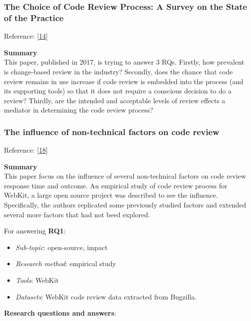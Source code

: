 \documentclass[]{book}
\providecommand{\tightlist}{%
  \setlength{\itemsep}{0pt}\setlength{\parskip}{0pt}}
\begin{document}
\subsubsection{The Choice of Code Review Process: A Survey on the State
of the
Practice}\label{the-choice-of-code-review-process-a-survey-on-the-state-of-the-practice}

Reference: {[}\protect\hyperlink{ref-baum2017choice}{14}{]}

\textbf{Summary}\\
This paper, published in 2017, is trying to answer 3 RQs. Firstly, how
prevalent is change-based review in the industry? Secondly, does the
chance that code review remains in use increase if code review is
embedded into the process (and its supporting tools) so that it does not
require a conscious decision to do a review? Thirdly, are the intended
and acceptable levels of review effects a mediator in determining the
code review process?

\subsubsection{The influence of non-technical factors on code
review}\label{the-influence-of-non-technical-factors-on-code-review}

Reference: {[}\protect\hyperlink{ref-baysal2013influence}{18}{]}

\textbf{Summary}\\
This paper focus on the influence of several non-technical factors on
code review response time and outcome. An empirical study of code review
process for WebKit, a large open source project was described to see the
influence. Specifically, the authors replicated some previously studied
factors and extended several more factors that had not beed explored.

For answering \textbf{RQ1}:

\begin{itemize}
\tightlist
\item
  \emph{Sub-topic}: open-source, impact
\item
  \emph{Research method}: empirical study
\item
  \emph{Tools}: WebKit
\item
  \emph{Datasets}: WebKit code review data extracted from Bugzilla.
\end{itemize}

\textbf{Research questions and answers}:
\end{document}
